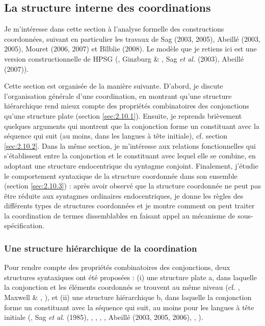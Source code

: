 \subsection{La structure interne des coordinations}
\label{bkm:Ref302035599}Je m'intéresse dans cette section à l'analyse formelle des constructions coordonnées, suivant en particulier les travaux de Sag (2003, 2005), Abeillé (2003, 2005), Mouret (2006, 2007) et Bîlbîie (2008). Le modèle que je retiens ici est une version constructionnelle de HPSG (\citet{Sag1997}, Ginzburg \& \citet{Sag2000}, Sag \textit{et al.} (2003), Abeillé (2007)). 

Cette section est organisée de la manière suivante. D'abord, je discute l'organisation générale d'une coordination, en montrant qu'une structure hiérarchique rend mieux compte des propriétés combinatoires des conjonctions qu'une structure plate (section \ref{sec:2.10.1}). Ensuite, je reprends brièvement quelques arguments qui montrent que la conjonction forme un constituant avec la séquence qui suit (au moins, dans les langues à tête initiale), cf. section \ref{sec:2.10.2}. Dans la même section, je m'intéresse aux relations fonctionnelles qui s'établissent entre la conjonction et le constituant avec lequel elle se combine, en adoptant une structure endocentrique du syntagme conjoint. Finalement, j'étudie le comportement syntaxique de la structure coordonnée dans son ensemble (section \ref{sec:2.10.3}) : après avoir observé que la structure coordonnée ne peut pas être réduite aux syntagmes ordinaires endocentriques, je donne les règles des différents types de structures coordonnées et je montre comment on peut traiter la coordination de termes dissemblables en faisant appel au mécanisme de sous-spécification.  

\subsubsection{Une structure hiérarchique de la coordination} 
\label{bkm:Ref301808090}Pour rendre compte des propriétés combinatoires des conjonctions, deux structures syntaxiques ont été proposées : (i) une structure plate a, dans laquelle la conjonction et les éléments coordonnés se trouvent au même niveau (cf. \citet{Jackendoff1977}, Maxwell \& \citet{Manning1996}, \citet{Dalrymple2001}), et (ii) une structure hiérarchique b, dans laquelle la conjonction forme un constituant avec la séquence qui suit, au moins pour les langues à tête initiale (\citet{Ross1967}, Sag \textit{et al.} (1985), \citet{Munn1993}, \citet{Paritong1992}, \citet{Kayne1994}, \citet{Johannessen1998}, Abeillé (2003, 2005, 2006), \citet{Skrabalova2004}, \citet{Mouret2007}).


